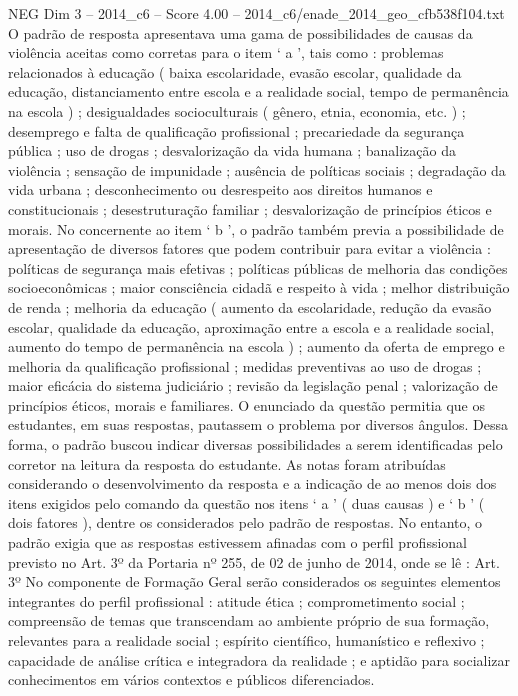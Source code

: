 \begin{textsample}{NEG Dim 3 – 2014\_c6 – Score 4.00 – 2014\_c6/enade\_2014\_geo\_cfb538f104.txt}
O padrão de resposta apresentava uma gama de possibilidades de causas da violência aceitas como corretas para o item ‘ a ’, tais como : problemas relacionados à educação ( baixa escolaridade, evasão escolar, qualidade da educação, distanciamento entre escola e a realidade social, tempo de permanência na escola ) ; desigualdades socioculturais ( gênero, etnia, economia, etc. ) ; desemprego e falta de qualificação profissional ; precariedade da segurança pública ; uso de drogas ; desvalorização da vida humana ; banalização da violência ; sensação de impunidade ; ausência de políticas sociais ; degradação da vida urbana ; desconhecimento ou desrespeito aos direitos humanos e constitucionais ; desestruturação familiar ; desvalorização de princípios éticos e morais.
No concernente ao item ‘ b ’, o padrão também previa a possibilidade de apresentação de diversos fatores que podem contribuir para evitar a violência : políticas de segurança mais efetivas ; políticas públicas de melhoria das condições socioeconômicas ; maior consciência cidadã e respeito à vida ; melhor distribuição de renda ; melhoria da educação ( aumento da escolaridade, redução da evasão escolar, qualidade da educação, aproximação entre a escola e a realidade social, aumento do tempo de permanência na escola ) ; aumento da oferta de emprego e melhoria da qualificação profissional ; medidas preventivas ao uso de drogas ; maior eficácia do sistema judiciário ; revisão da legislação penal ; valorização de princípios éticos, morais e familiares.
O enunciado da questão permitia que os estudantes, em suas respostas, pautassem o problema por diversos ângulos.
Dessa forma, o padrão buscou indicar diversas possibilidades a serem identificadas pelo corretor na leitura da resposta do estudante.
As notas foram atribuídas considerando o desenvolvimento da resposta e a indicação de ao menos dois dos itens exigidos pelo comando da questão nos itens ‘ a ’ ( duas causas ) e ‘ b ’ ( dois fatores ), dentre os considerados pelo padrão de respostas.
No entanto, o padrão exigia que as respostas estivessem afinadas com o perfil profissional previsto no Art. 3º da Portaria nº 255, de 02 de junho de 2014, onde se lê : Art. 3º No componente de Formação Geral serão considerados os seguintes elementos integrantes do perfil profissional : atitude ética ; comprometimento social ; compreensão de temas que transcendam ao ambiente próprio de sua formação, relevantes para a realidade social ; espírito científico, humanístico e reflexivo ; capacidade de análise crítica e integradora da realidade ; e aptidão para socializar conhecimentos em vários contextos e públicos diferenciados.

\end{textsample}
